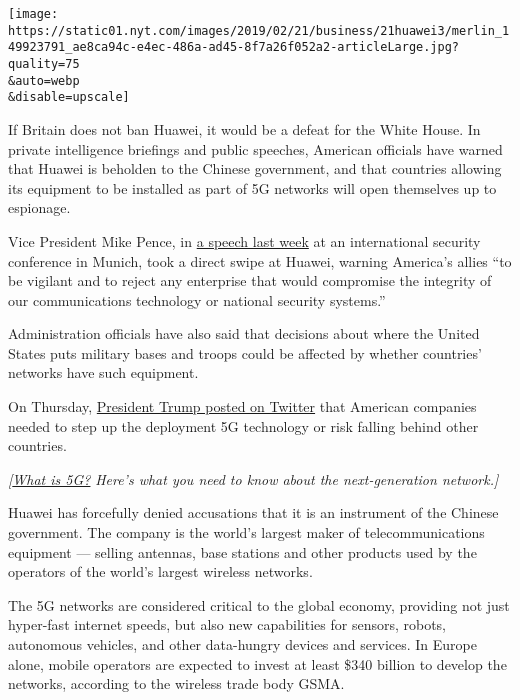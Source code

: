 \texttt{[image: https://static01.nyt.com/images/2019/02/21/business/21huawei3/merlin\_149923791\_ae8ca94c-e4ec-486a-ad45-8f7a26f052a2-articleLarge.jpg?quality=75\\\&auto=webp\\\&disable=upscale]}

If Britain does not ban Huawei, it would be a defeat for the White
House. In private intelligence briefings and public speeches, American
officials have warned that Huawei is beholden to the Chinese government,
and that countries allowing its equipment to be installed as part of 5G
networks will open themselves up to espionage.

Vice President Mike Pence, in
\href{https://www.whitehouse.gov/briefings-statements/remarks-vice-president-pence-2019-munich-security-conference-munich-germany/}{a
speech last week} at an international security conference in Munich,
took a direct swipe at Huawei, warning America's allies ``to be vigilant
and to reject any enterprise that would compromise the integrity of our
communications technology or national security systems.''

Administration officials have also said that decisions about where the
United States puts military bases and troops could be affected by
whether countries' networks have such equipment.

On Thursday,
\href{https://twitter.com/realDonaldTrump/status/1098581869233344512?ref_src=twsrc\%5Egoogle\%7Ctwcamp\%5Eserp\%7Ctwgr\%5Etweet}{President
Trump posted on Twitter} that American companies needed to step up the
deployment 5G technology or risk falling behind other countries.

\emph{{[}}\href{https://www.nytimes.com/2018/12/31/technology/personaltech/5g-what-you-need-to-know.html}{\emph{What
is 5G?}} \emph{Here's what you need to know about the next-generation
network.{]}}

Huawei has forcefully denied accusations that it is an instrument of the
Chinese government. The company is the world's largest maker of
telecommunications equipment --- selling antennas, base stations and
other products used by the operators of the world's largest wireless
networks.

The 5G networks are considered critical to the global economy, providing
not just hyper-fast internet speeds, but also new capabilities for
sensors, robots, autonomous vehicles, and other data-hungry devices and
services. In Europe alone, mobile operators are expected to invest at
least \$340 billion to develop the networks, according to the wireless
trade body GSMA.

